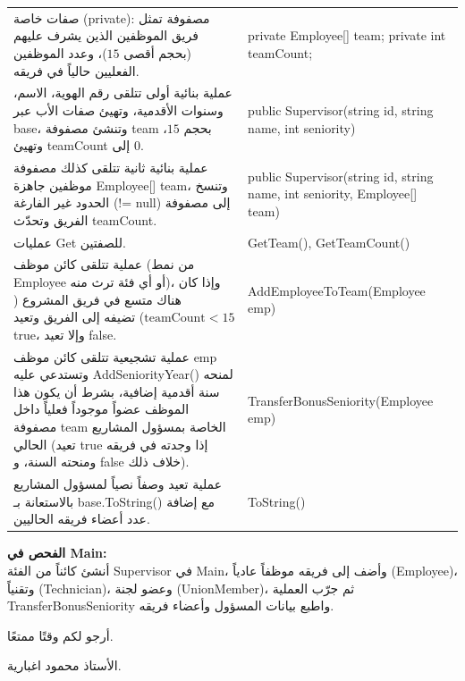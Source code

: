 \documentclass[14pt]{extarticle}
\begin{document}
\begin{enumerate}[label=\textbf{تمرين \arabic*:}, wide=0pt, itemsep=2.2em]
    {\renewcommand{\arraystretch}{1.2}
    \small
    \begin{longtable}{|>{\raggedleft\arraybackslash}p{}|>{\raggedright\arraybackslash}p{}|}
    \hline
    \multicolumn{2}{|c|}{\textbf{الفئة الفرعية: \textenglish{Supervisor : Employee}}} \\
    \hline
    صفات خاصة (\textenglish{private}): مصفوفة تمثل فريق الموظفين الذين يشرف عليهم (بحجم أقصى $15$)، وعدد الموظفين الفعليين حالياً في فريقه. & \textenglish{private Employee[] team;} \newline \textenglish{private int teamCount;} \\
    \hline
    عملية بنائية أولى تتلقى رقم الهوية، الاسم، وسنوات الأقدمية، وتهيئ صفات الأب عبر \textenglish{base}، وتنشئ مصفوفة \textenglish{team} بحجم $15$، وتهيئ \textenglish{teamCount} إلى $0$. & \textenglish{public Supervisor(string id, string name, int seniority)} \\
    \hline
    عملية بنائية ثانية تتلقى كذلك مصفوفة موظفين جاهزة \textenglish{Employee[] team}، وتنسخ الحدود غير الفارغة (\textenglish{!= null}) إلى مصفوفة الفريق وتحدّث \textenglish{teamCount}. & \textenglish{public Supervisor(string id, string name, int seniority, Employee[] team)} \\
    \hline
    عمليات \textenglish{Get} للصفتين. & \textenglish{GetTeam(), GetTeamCount()} \\
    \hline
    عملية تتلقى كائن موظف (من نمط \textenglish{Employee} أو أي فئة ترث منه)، وإذا كان هناك متسع في فريق المشروع ($\text{teamCount} < 15$) تضيفه إلى الفريق وتعيد \textenglish{true}، وإلا تعيد \textenglish{false}. & \textenglish{AddEmployeeToTeam(Employee emp)} \\
    \hline
    عملية تشجيعية تتلقى كائن موظف \textenglish{emp} وتستدعي عليه \textenglish{AddSeniorityYear()} لمنحه سنة أقدمية إضافية، بشرط أن يكون هذا الموظف عضواً موجوداً فعلياً داخل مصفوفة \textenglish{team} الخاصة بمسؤول المشاريع الحالي (تعيد \textenglish{true} إذا وجدته في فريقه ومنحته السنة، و \textenglish{false} خلاف ذلك). & \textenglish{TransferBonusSeniority(Employee emp)} \\
    \hline
    عملية تعيد وصفاً نصياً لمسؤول المشاريع بالاستعانة بـ \textenglish{base.ToString()} مع إضافة عدد أعضاء فريقه الحاليين. & \textenglish{ToString()} \\
    \hline
    \end{longtable}}

    \vspace{1em}
    \noindent \textbf{الفحص في \textenglish{Main}:} \\
    أنشئ كائناً من الفئة \textenglish{Supervisor} في \textenglish{Main}، وأضف إلى فريقه موظفاً عادياً (\textenglish{Employee})، وتقنياً (\textenglish{Technician})، وعضو لجنة (\textenglish{UnionMember})، ثم جرّب العملية \\
     \textenglish{TransferBonusSeniority} واطبع بيانات المسؤول وأعضاء فريقه.
    \filbreak

\end{enumerate}

\vspace{1cm}
\begin{flushleft}
أرجو لكم وقتًا ممتعًا.

الأستاذ محمود اغبارية.
\end{flushleft}
\end{document}
